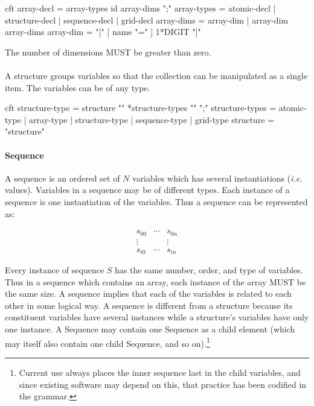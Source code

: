 \documentclass[justify]{nasa-ese}
\begin{document}
\begin{vcode}{cft}
array-decl  = array-types id array-dims ";" 
array-types = atomic-decl | structure-decl | sequence-decl | grid-decl 
array-dims  = array-dim | array-dim array-dims 
array-dim   = "[" [ name "=" ] 1*DIGIT "]" 
\end{vcode}

The number of dimensions MUST be greater than zero.

\paragraph{\Structure}
\label{sec:structure}
 A structure groups variables so that the collection can be
  manipulated as a single item. The variables can be of any type.

\begin{vcode}{cft}
structure-type  = structure "{" *structure-types "}" ";" 
structure-types = atomic-type | array-type 
                  | structure-type | sequence-type | grid-type 
structure       = "structure"
\end{vcode}
              
\paragraph{Sequence}
\label{sec:sequence}
A sequence is an ordered set of $N$ variables which has several
instantiations ({\it i.e.} values). Variables in a sequence may be of
different types. Each instance of a sequence is one instantiation of
the variables. Thus a sequence can be represented as:

\begin{displaymath}
\begin{array}{ccc}
  s_{0 0} & \cdots & s_{0 n} \\
  \vdots & & \vdots \\
  s_{i 0} & \cdots & s_{i n}
\end{array}
\end{displaymath}

\noindent Every instance of sequence $S$ has the same number, order,
and type of variables. Thus in a sequence which contains an array,
each instance of the array MUST be the same size. A sequence implies
that each of the variables is related to each other in some logical
way. A sequence is different from a structure because its constituent
variables have several instances while a structure's variables have
only one instance. A Sequence may contain one Sequence as a child
element (which may itself also contain one child Sequence, and so
on).\footnote{Current use always places the inner sequence last in the
  child variables, and since existing software may depend on this,
  that practice has been codified in the grammar.}
\label{sequence-grammar}
\end{document}
